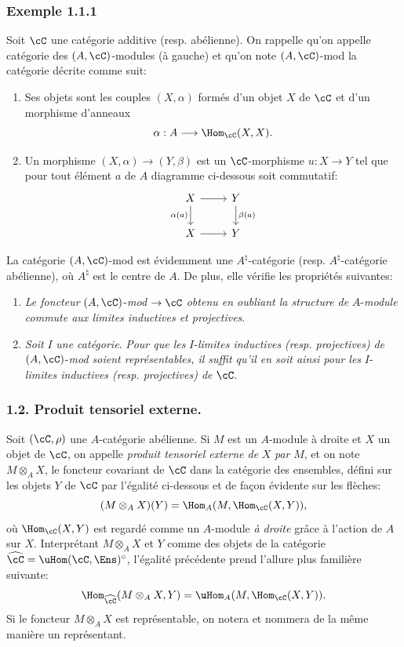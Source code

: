 \subsubsection*{Exemple 1.1.1}
Soit $\cC$ une catégorie additive (resp. abélienne). On rappelle qu'on appelle catégorie des $(A,\cC)$-modules (à gauche) et qu'on note $(A,\cC)$-mod la catégorie décrite comme suit:
\begin{enumerate}[label=(\roman*)]
\item Ses
objets sont les couples $(X,\alpha)$ formés d'un objet $X$ de $\cC$ et d'un morphisme d'anneaux
\[
\alpha:A\longrightarrow \Hom_{\cC}(X,X).
\]
\item Un morphisme $(X,\alpha)\to(Y,\beta)$ est un $\cC$-morphisme $u:X\to Y$ tel que pour tout élément $a$ de $A$  diagramme ci-dessous soit commutatif:
\[
\begin{tikzcd}
X \arrow[r] \arrow[d,"\alpha(a)"'] & Y \arrow[d,"\beta(a)"]\\
X \arrow[r] & Y
\end{tikzcd}
\]
\end{enumerate}
La catégorie $(A,\cC)$-mod est évidemment une $A^{\natural}$-catégorie (resp. $A^{\natural}$-catégorie abélienne), où $A^{\natural}$ est le centre de $A$. De plus, elle vérifie les propriétés suivantes:
\begin{enumerate}[label=(\alph*)]
\item \emph{Le foncteur} $(A,\cC)$-\emph{mod} $\to\cC$ \emph{obtenu en oubliant la structure de} $A$-\emph{module commute aux limites inductives et projectives}.
\item \emph{Soit} $I$ \emph{une catégorie}. \emph{Pour que les} $I$-\emph{limites inductives} \emph{(resp. projectives)} \emph{de} $(A,\cC)$-\emph{mod soient représentables, il suffit qu'il en soit ainsi pour les} $I$-\emph{limites inductives (resp. projectives) de} $\cC$.
\end{enumerate}

\subsubsection*{1.2. Produit tensoriel externe.}
Soit $(\cC,\rho)$ une $A$-catégorie abélienne. Si $M$ est un $A$-module à droite et $X$ un objet de $\cC$, on appelle \emph{produit tensoriel externe de} $X$ \emph{par} $M$, et on note $M\otimes_A X$, le foncteur covariant de $\cC$ dans la catégorie des ensembles, défini sur les objets $Y$ de $\cC$ par l'égalité ci-dessous et de façon évidente sur les flèches:
\[
(M\otimes_A X)(Y)=\Hom_A(M,\Hom_{\cC}(X,Y)),
\]
où $\Hom_{\cC}(X,Y)$ est regardé comme un $A$-module \emph{à droite} grâce à l'action de $A$ sur $X$. Interprétant $M\otimes_AX$ et $Y$ comme des objets de la catégorie $\widehat{\cC}=\uHom(\cC,\Ens)^{\circ}$, l'égalité précédente prend l'allure plus familière
suivante:
\[
\Hom_{\widehat{\cC}}(M\otimes_A X,Y)=\uHom_A(M,\Hom_{\cC}(X,Y)).
\]
Si le foncteur $M\otimes_A X$ est représentable, on notera et nommera de la même manière un représentant.

